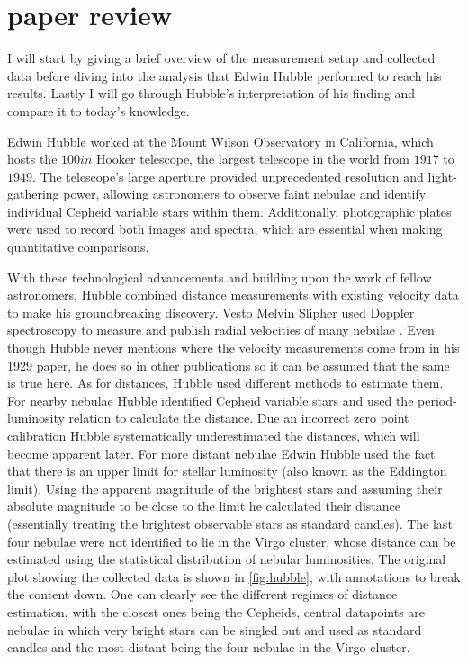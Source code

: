 \section{paper review}\label{theorie}
I will start by giving a brief overview of the measurement setup and collected data before diving into the analysis that Edwin Hubble performed to reach his results. Lastly I will go through Hubble's interpretation of his finding and compare it to today's knowledge. 

Edwin Hubble worked at the Mount Wilson Observatory in California, which hosts the \( 100 \unit{in} \) Hooker telescope, the largest telescope in the world from \( 1917 \) to \( 1949 \). The telescope's large aperture provided unprecedented resolution and light-gathering power, allowing astronomers to observe faint nebulae and identify individual Cepheid variable stars within them. Additionally, photographic plates were used to record both images and spectra, which are essential when making quantitative comparisons.

With these technological advancements and building upon the work of fellow astronomers, Hubble combined distance measurements with existing velocity data to make his groundbreaking discovery. Vesto Melvin Slipher used Doppler spectroscopy to measure and publish radial velocities of many nebulae \autocite{slipher1915spectrographic}. Even though Hubble never mentions where the velocity measurements come from in his 1929 paper, he does so in other publications so it can be assumed that the same is true here. As for distances, Hubble used different methods to estimate them. For nearby nebulae Hubble identified Cepheid variable stars and used the period-luminosity relation to calculate the distance. Due an incorrect zero point calibration Hubble systematically underestimated the distances, which will become apparent later. For more distant nebulae Edwin Hubble used the fact that there is an upper limit for stellar luminosity (also known as the Eddington limit). Using the apparent magnitude of the brightest stars and assuming their absolute magnitude to be close to the limit he calculated their distance (essentially treating the brightest observable stars as standard candles). The last four nebulae were not identified to lie in the Virgo cluster, whose distance can be estimated using the statistical distribution of nebular luminosities. The original plot showing the collected data is shown in \autoref{fig:hubble}, with annotations to break the content down. One can clearly see the different regimes of distance estimation, with the closest ones being the Cepheids, central datapoints are nebulae in which very bright stars can be singled out and used as standard candles and the most distant being the four nebulae in the Virgo cluster.

